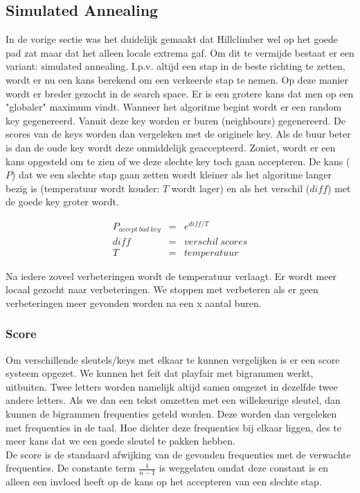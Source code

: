 \documentclass{article}
\begin{document}
\subsection{Simulated Annealing}
In de vorige sectie was het duidelijk gemaakt dat Hillclimber wel op het goede pad zat maar dat het alleen locale extrema gaf. Om dit te vermijde bestaat er een variant: simulated annealing. I.p.v. altijd een stap in de beste richting te zetten, wordt er nu een kans berekend om een verkeerde stap te nemen. Op deze manier wordt er breder gezocht in de search space. Er is een grotere kans dat men op een "globaler" maximum vindt. Wanneer het algoritme begint wordt er een random key gegenereerd. Vanuit deze key worden er buren (neighbours) gegenereerd. De scores van de keys worden dan vergeleken met de originele key. Als de buur beter is dan de oude key wordt deze onmiddelijk geaccepteerd. Zoniet, wordt er een kans opgesteld om te zien of we deze slechte key toch gaan accepteren. De kans ($P$) dat we een slechte stap gaan zetten wordt kleiner als het algoritme langer bezig is (temperatuur wordt kouder: $T$ wordt lager) en als het verschil ($diff$) met de goede key groter wordt.

\begin{eqnarray}
P_{accept\ bad\ key} &=& e^{diff/T}	\\
				diff &=& verschil\ scores \\
				T	 &=& temperatuur
\end{eqnarray}

Na iedere zoveel verbeteringen wordt de temperatuur verlaagt. Er wordt meer locaal gezocht naar verbeteringen. We stoppen met verbeteren als er geen verbeteringen meer gevonden worden na een x aantal buren.\\

\subsubsection{Score}
Om verschillende sleutels/keys met elkaar te kunnen vergelijken is er een score systeem opgezet. We kunnen het feit dat playfair met bigrammen werkt, uitbuiten. Twee letters worden namelijk altijd samen omgezet in dezelfde twee andere letters. Als we dan een tekst omzetten met een willekeurige sleutel, dan kunnen  de bigrammen frequenties geteld worden. Deze worden dan vergeleken met frequenties in de taal. Hoe dichter deze frequenties bij elkaar liggen, des te meer kans dat we een goede sleutel te pakken hebben.\\
De score is de standaard afwijking van de gevonden frequenties met de verwachte frequenties. De constante term $\frac{1}{n-1}$ is weggelaten omdat deze constant is en alleen een invloed heeft op  de kans op het accepteren van een slechte stap.\\ 
\end{document}
